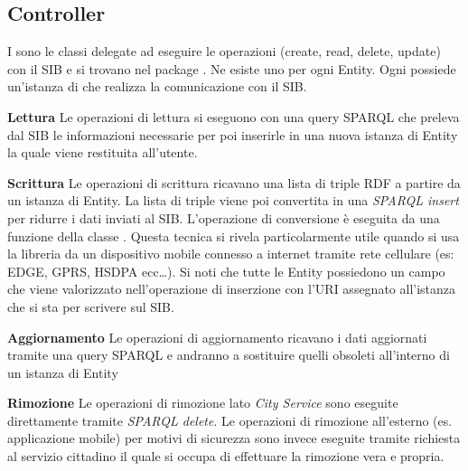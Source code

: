 \subsection{Controller}

I  sono le classi delegate ad eseguire le operazioni  (create, read, delete, update) con il SIB e si trovano nel package . Ne esiste uno per ogni Entity. Ogni  possiede un'istanza di  che realizza la comunicazione con il SIB. 

\begin{description}
	\item \textbf{Lettura} Le operazioni di lettura si eseguono con una query SPARQL che preleva dal SIB le informazioni necessarie per poi inserirle in una nuova istanza di Entity la quale viene restituita all'utente.

	\item \textbf{Scrittura} Le operazioni di scrittura ricavano una lista di triple RDF a partire da un istanza di Entity. La lista di triple viene poi convertita in una \emph{SPARQL insert} per ridurre i dati inviati al SIB. L'operazione di conversione è eseguita da una funzione della classe . Questa tecnica si rivela particolarmente utile quando si usa la libreria da un dispositivo mobile connesso a internet tramite rete cellulare (es: EDGE, GPRS, HSDPA ecc\dots). Si noti che tutte le Entity possiedono un campo  che viene valorizzato nell'operazione di inserzione con l'URI assegnato all'istanza che si sta per scrivere sul SIB. 

	\item \textbf{Aggiornamento} Le operazioni di aggiornamento ricavano i dati aggiornati tramite una query SPARQL e andranno a sostituire quelli obsoleti all'interno di un istanza di Entity

	\item \textbf{Rimozione} Le operazioni di rimozione lato \emph{City Service} sono eseguite direttamente tramite \emph{SPARQL delete}. Le operazioni di rimozione all'esterno (es. applicazione mobile) per motivi di sicurezza sono invece eseguite tramite richiesta al servizio cittadino il quale si occupa di effettuare la rimozione vera e propria.
\end{description}














